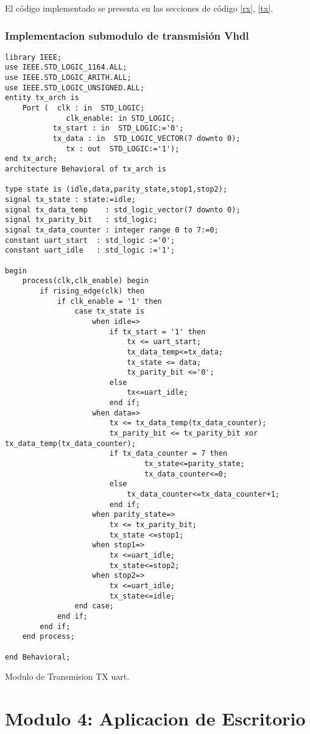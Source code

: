 \documentclass[a4paper]{article}
\begin{document}
El código implementado se presenta en las secciones de código \ref{rx}, \ref{tx}.

\subsubsection{Implementacion submodulo de transmisión Vhdl}
\begin{listing}[H]
	\begin{verbatim}
library IEEE;
use IEEE.STD_LOGIC_1164.ALL;
use IEEE.STD_LOGIC_ARITH.ALL;
use IEEE.STD_LOGIC_UNSIGNED.ALL;
entity tx_arch is
	Port (  clk : in  STD_LOGIC;
			  clk_enable: in STD_LOGIC;
           tx_start : in  STD_LOGIC:='0';
           tx_data : in  STD_LOGIC_VECTOR(7 downto 0);
			  tx : out  STD_LOGIC:='1');
end tx_arch;
architecture Behavioral of tx_arch is

type state is (idle,data,parity_state,stop1,stop2);
signal tx_state : state:=idle;
signal tx_data_temp    : std_logic_vector(7 downto 0);
signal tx_parity_bit   : std_logic;
signal tx_data_counter : integer range 0 to 7:=0;
constant uart_start  : std_logic :='0';
constant uart_idle   : std_logic :='1';

begin
	process(clk,clk_enable) begin
		if rising_edge(clk) then
			if clk_enable = '1' then
				case tx_state is
					when idle=>
						if tx_start = '1' then
							tx <= uart_start;
							tx_data_temp<=tx_data;
							tx_state <= data;
							tx_parity_bit <='0';
						else
							tx<=uart_idle;
						end if;
					when data=>
						tx <= tx_data_temp(tx_data_counter);
						tx_parity_bit <= tx_parity_bit xor tx_data_temp(tx_data_counter);
						if tx_data_counter = 7 then
								tx_state<=parity_state;
								tx_data_counter<=0;	
						else
							tx_data_counter<=tx_data_counter+1;
						end if;
					when parity_state=>
						tx <= tx_parity_bit;
						tx_state <=stop1;
					when stop1=>
						tx <=uart_idle;
						tx_state<=stop2;
					when stop2=>
						tx <=uart_idle;
						tx_state<=idle;
				end case;
			end if;
		end if;
	end process;

end Behavioral;
\end{verbatim}
\caption{Modulo de Transmision TX uart.}
    \label{tx}
\end{listing}

\newpage
\section{Modulo 4: Aplicacion de Escritorio \label{aplicacion}}
\end{document}
